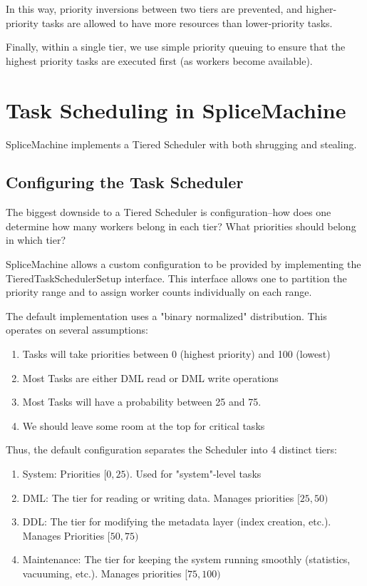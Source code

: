In this way, priority inversions between two tiers are prevented, and higher-priority tasks are allowed to have more resources than lower-priority tasks.

Finally, within a single tier, we use simple priority queuing to ensure that the highest priority tasks are executed first (as workers become available).

\section{Task Scheduling in SpliceMachine}
SpliceMachine implements a Tiered Scheduler with both shrugging and stealing.

\subsection{Configuring the Task Scheduler}
The biggest downside to a Tiered Scheduler is configuration--how does one determine how many workers belong in each tier? What priorities should belong in which tier?

SpliceMachine allows a custom configuration to be provided by implementing the TieredTaskSchedulerSetup interface. This interface allows one to partition the priority range and to assign worker counts individually on each range.

The default implementation uses a "binary normalized" distribution. This operates on several assumptions:

\begin{enumerate}
\item Tasks will take priorities between 0 (highest priority) and 100 (lowest)
\item Most Tasks are either DML read or DML write operations
\item Most Tasks will have a probability between 25 and 75.
\item We should leave some room at the top for critical tasks
\end{enumerate}

Thus, the default configuration separates the Scheduler into 4 distinct tiers:

\begin{enumerate}
\item System: Priorities $[0,25)$. Used for "system"-level tasks
\item DML: The tier for reading or writing data. Manages priorities $[25,50)$
\item DDL: The tier for modifying the metadata layer (index creation, etc.). Manages Priorities $[50,75)$
\item Maintenance: The tier for keeping the system running smoothly (statistics, vacuuming, etc.). Manages priorities $[75,100)$
\end{enumerate}

